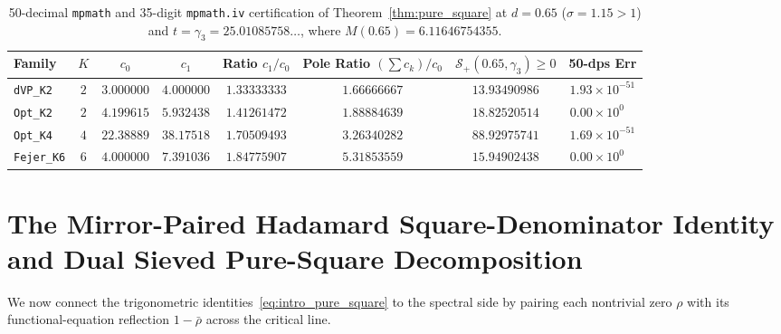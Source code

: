 \documentclass[11pt,reqno]{amsart}
\theoremstyle{definition}
\theoremstyle{remark}
\numberwithin{equation}{section}
\begin{document}
\begin{table}[t]
\centering
\caption{50-decimal \texttt{mpmath} and 35-digit \texttt{mpmath.iv} certification of Theorem~\ref{thm:pure_square} at $d = 0.65$ ($\sigma = 1.15 > 1$) and $t = \gamma_3 = 25.01085758\dots$, where $M(0.65) = 6.11646754355$.}\label{tab:pure_square}
\footnotesize
\setlength{\tabcolsep}{3.0pt}
\begin{tabular}{@{}lccccccc@{}}
\toprule
Family & $K$ & $c_0$ & $c_1$ & Ratio $c_1/c_0$ & Pole Ratio $(\sum c_k)/c_0$ & $\mathcal{S}_+(0.65, \gamma_3) \ge 0$ & 50-dps Err \\
\midrule
\texttt{dVP\_K2}   & $2$ & $3.000000$ & $4.000000$ & $1.33333333$ & $1.66666667$ & $13.93490986$ & $1.93 \times 10^{-51}$ \\
\texttt{Opt\_K2}   & $2$ & $4.199615$ & $5.932438$ & $1.41261472$ & $1.88884639$ & $18.82520514$ & $0.00 \times 10^{0\phantom{-}}$ \\
\texttt{Opt\_K4}   & $4$ & $22.38889$ & $38.17518$ & $1.70509493$ & $3.26340282$ & $88.92975741$ & $1.69 \times 10^{-51}$ \\
\texttt{Fejer\_K6} & $6$ & $4.000000$ & $7.391036$ & $1.84775907$ & $5.31853559$ & $15.94902438$ & $0.00 \times 10^{0\phantom{-}}$ \\
\bottomrule
\end{tabular}
\end{table}

\section{The Mirror-Paired Hadamard Square-Denominator Identity and Dual Sieved Pure-Square Decomposition}\label{sec:mirror_hadamard}

We now connect the trigonometric identities~\eqref{eq:intro_pure_square} to the spectral side by pairing each nontrivial zero $\rho$ with its functional-equation reflection $1 - \bar{\rho}$ across the critical line.
\end{document}
